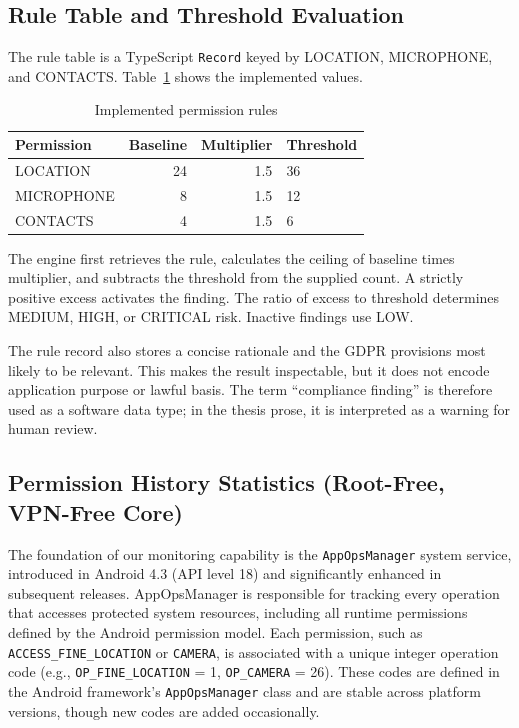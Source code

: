 \subsection{Rule Table and Threshold Evaluation}

The rule table is a TypeScript \texttt{Record} keyed by LOCATION, MICROPHONE, and CONTACTS. Table~\ref{tab:implemented-rules} shows the implemented values.

\begin{table}[H]
\centering
\caption{Implemented permission rules}
\label{tab:implemented-rules}
\begin{tabular}{lrrl}
\toprule
\textbf{Permission} & \textbf{Baseline} & \textbf{Multiplier} & \textbf{Threshold} \\
\midrule
LOCATION & 24 & 1.5 & 36 \\
MICROPHONE & 8 & 1.5 & 12 \\
CONTACTS & 4 & 1.5 & 6 \\
\bottomrule
\end{tabular}
\end{table}

The engine first retrieves the rule, calculates the ceiling of baseline times multiplier, and subtracts the threshold from the supplied count. A strictly positive excess activates the finding. The ratio of excess to threshold determines MEDIUM, HIGH, or CRITICAL risk. Inactive findings use LOW.

The rule record also stores a concise rationale and the GDPR provisions most likely to be relevant. This makes the result inspectable, but it does not encode application purpose or lawful basis. The term ``compliance finding'' is therefore used as a software data type; in the thesis prose, it is interpreted as a warning for human review.

\subsection{Permission History Statistics (Root-Free, VPN-Free Core)}

The foundation of our monitoring capability is the \texttt{AppOpsManager} system service, introduced in Android 4.3 (API level 18) and significantly enhanced in subsequent releases. AppOpsManager is responsible for tracking every operation that accesses protected system resources, including all runtime permissions defined by the Android permission model. Each permission, such as \texttt{ACCESS\_FINE\_LOCATION} or \texttt{CAMERA}, is associated with a unique integer operation code (e.g., \texttt{OP\_FINE\_LOCATION} = 1, \texttt{OP\_CAMERA} = 26). These codes are defined in the Android framework's \texttt{AppOpsManager} class and are stable across platform versions, though new codes are added occasionally.

